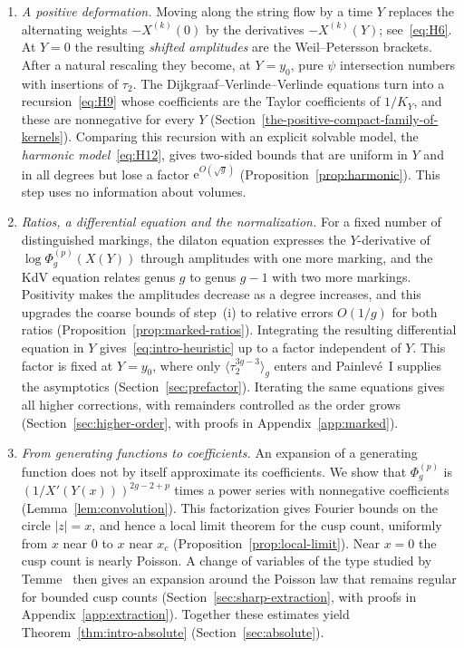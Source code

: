 \begin{enumerate}[label=(\roman*),leftmargin=*]
\item \emph{A positive deformation.}
Moving along the string flow by a time $Y$ replaces the alternating weights $-X^{(k)}(0)$ by the derivatives $-X^{(k)}(Y)$; see~\eqref{eq:H6}. At $Y=0$ the resulting \emph{shifted amplitudes} are the Weil--Petersson brackets. After a natural rescaling they become, at $Y=y_0$, pure $\psi$ intersection numbers with insertions of $\tau_2$. The Dijkgraaf--Verlinde--Verlinde equations turn into a recursion~\eqref{eq:H9} whose coefficients are the Taylor coefficients of $1/K_Y$, and these are nonnegative for every $Y$ (Section~\ref{the-positive-compact-family-of-kernels}). Comparing this recursion with an explicit solvable model, the \emph{harmonic model}~\eqref{eq:H12}, gives two-sided bounds that are uniform in $Y$ and in all degrees but lose a factor $\mathrm e^{O(\sqrt g)}$ (Proposition~\ref{prop:harmonic}). This step uses no information about volumes.

\item \emph{Ratios, a differential equation and the normalization.}
For a fixed number of distinguished markings, the dilaton equation expresses the $Y$-derivative of $\log\Phi_g^{(p)}(X(Y))$ through amplitudes with one more marking, and the KdV equation relates genus $g$ to genus $g-1$ with two more markings. Positivity makes the amplitudes decrease as a degree increases, and this upgrades the coarse bounds of step~(i) to relative errors $O(1/g)$ for both ratios (Proposition~\ref{prop:marked-ratios}). Integrating the resulting differential equation in $Y$ gives~\eqref{eq:intro-heuristic} up to a factor independent of $Y$. This factor is fixed at $Y=y_0$, where only $\langle\tau_2^{3g-3}\rangle_g$ enters and Painlev\'e~I supplies the asymptotics (Section~\ref{sec:prefactor}). Iterating the same equations gives all higher corrections, with remainders controlled as the order grows (Section~\ref{sec:higher-order}, with proofs in Appendix~\ref{app:marked}).

\item \emph{From generating functions to coefficients.}
An expansion of a generating function does not by itself approximate its coefficients. We show that $\Phi_g^{(p)}$ is $(1/X'(Y(x)))^{2g-2+p}$ times a power series with nonnegative coefficients (Lemma~\ref{lem:convolution}). This factorization gives Fourier bounds on the circle $|z|=x$, and hence a local limit theorem for the cusp count, uniformly from $x$ near $0$ to $x$ near $x_c$ (Proposition~\ref{prop:local-limit}). Near $x=0$ the cusp count is nearly Poisson. A change of variables of the type studied by Temme~\cite{Temme} then gives an expansion around the Poisson law that remains regular for bounded cusp counts (Section~\ref{sec:sharp-extraction}, with proofs in Appendix~\ref{app:extraction}). Together these estimates yield Theorem~\ref{thm:intro-absolute} (Section~\ref{sec:absolute}).
\end{enumerate}

